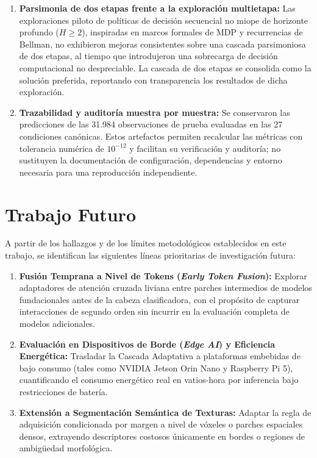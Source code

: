\begin{enumerate}
\item \textbf{Parsimonia de dos etapas frente a la exploración multietapa:} Las exploraciones piloto de políticas de decisión secuencial no miope de horizonte profundo ($H \ge 2$), inspiradas en marcos formales de MDP y recurrencias de Bellman, no exhibieron mejoras consistentes sobre una cascada parsimoniosa de dos etapas, al tiempo que introdujeron una sobrecarga de decisión computacional no despreciable. La cascada de dos etapas se consolida como la solución preferida, reportando con transparencia los resultados de dicha exploración.

\item \textbf{Trazabilidad y auditoría muestra por muestra:} Se conservaron las predicciones de las 31.984 observaciones de prueba evaluadas en las 27 condiciones canónicas. Estos artefactos permiten recalcular las métricas con tolerancia numérica de $10^{-12}$ y facilitan su verificación y auditoría; no sustituyen la documentación de configuración, dependencias y entorno necesaria para una reproducción independiente.
\end{enumerate}

\section{Trabajo Futuro}

A partir de los hallazgos y de los límites metodológicos establecidos en este trabajo, se identifican las siguientes líneas prioritarias de investigación futura:

\begin{enumerate}
\item \textbf{Fusión Temprana a Nivel de Tokens (\emph{Early Token Fusion}):} Explorar adaptadores de atención cruzada liviana entre parches intermedios de modelos fundacionales antes de la cabeza clasificadora, con el propósito de capturar interacciones de segundo orden sin incurrir en la evaluación completa de modelos adicionales.
\item \textbf{Evaluación en Dispositivos de Borde (\emph{Edge AI}) y Eficiencia Energética:} Trasladar la Cascada Adaptativa a plataformas embebidas de bajo consumo (tales como NVIDIA Jetson Orin Nano y Raspberry Pi 5), cuantificando el consumo energético real en vatios-hora por inferencia bajo restricciones de batería.
\item \textbf{Extensión a Segmentación Semántica de Texturas:} Adaptar la regla de adquisición condicionada por margen a nivel de vóxeles o parches espaciales densos, extrayendo descriptores costosos únicamente en bordes o regiones de ambigüedad morfológica.
\end{enumerate}
